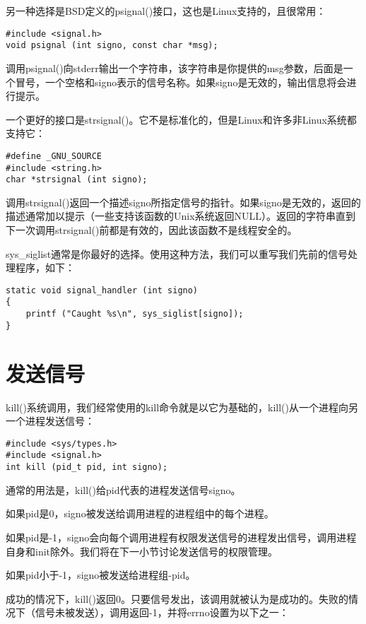 另一种选择是BSD定义的psignal()接口，这也是Linux支持的，且很常用：

\begin{lstlisting}
#include <signal.h>
void psignal (int signo, const char *msg);
\end{lstlisting}

调用psignal()向stderr输出一个字符串，该字符串是你提供的msg参数，后面是一个冒号，一个空格和signo表示的信号名称。如果signo是无效的，输出信息将会进行提示。

 一个更好的接口是strsignal()。它不是标准化的，但是Linux和许多非Linux系统都支持它：

\begin{lstlisting}
#define _GNU_SOURCE
#include <string.h>
char *strsignal (int signo);
\end{lstlisting}

调用strsignal()返回一个描述signo所指定信号的指针。如果signo是无效的，返回的描述通常加以提示（一些支持该函数的Unix系统返回NULL）。返回的字符串直到下一次调用strsignal()前都是有效的，因此该函数不是线程安全的。

sys\_siglist通常是你最好的选择。使用这种方法，我们可以重写我们先前的信号处理程序，如下：

\begin{lstlisting}
static void signal_handler (int signo)
{
    printf ("Caught %s\n", sys_siglist[signo]);
}
\end{lstlisting}

\section{发送信号}

kill()系统调用，我们经常使用的kill命令就是以它为基础的，kill()从一个进程向另一个进程发送信号：

\begin{lstlisting}
#include <sys/types.h>
#include <signal.h>
int kill (pid_t pid, int signo);
\end{lstlisting}

通常的用法是，kill()给pid代表的进程发送信号signo。

如果pid是0，signo被发送给调用进程的进程组中的每个进程。

如果pid是-1，signo会向每个调用进程有权限发送信号的进程发出信号，调用进程自身和init除外。我们将在下一小节讨论发送信号的权限管理。

如果pid小于-1，signo被发送给进程组-pid。

成功的情况下，kill()返回0。只要信号发出，该调用就被认为是成功的。失败的情况下（信号未被发送），调用返回-1，并将errno设置为以下之一：

